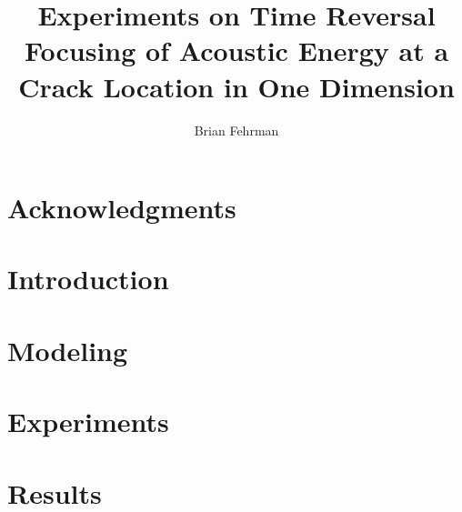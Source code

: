 \documentclass[13pt]{ucthesis}
\author{Brian Fehrman}
\title{Experiments on Time Reversal Focusing of Acoustic Energy at a Crack Location in One Dimension}
\begin{document}
\titlespacing{\chapter}{0pt}{-5pt}{-10pt}
\titlespacing{\section}{0pt}{0pt}{0pt}



\begin{frontmatter}
\begin{abstract}
\end{abstract}
\printglossary
\tableofcontents
\listoffigures
\end{frontmatter}

\chapter*{Acknowledgments}



\chapter{Introduction}\label{ch:Introduction}

\chapter{Modeling}\label{ch:Modeling}


\chapter{Experiments}\label{ch:Experiments}


\chapter{Results}\label{ch:Results}

\end{document}

